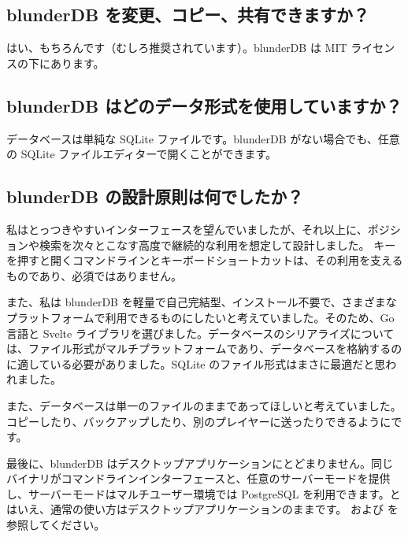 \documentclass[letterpaper,10pt,dvipdfmx]{sphinxmanual}
\begin{document}
\subsection{blunderDB を変更、コピー、共有できますか？}
\label{\detokenize{faq:puis-je-modifier-copier-partager-blunderdb}}
\sphinxAtStartPar
はい、もちろんです（むしろ推奨されています）。blunderDB は MIT ライセンスの下にあります。


\subsection{blunderDB はどのデータ形式を使用していますか？}
\label{\detokenize{faq:quel-format-de-donnees-utilise-blunderdb}}
\sphinxAtStartPar
データベースは単純な SQLite ファイルです。blunderDB がない場合でも、任意の SQLite ファイルエディターで開くことができます。


\subsection{blunderDB の設計原則は何でしたか？}
\label{\detokenize{faq:quelles-ont-ete-les-principes-de-conception-de-blunderdb}}
\sphinxAtStartPar
私はとっつきやすいインターフェースを望んでいましたが、それ以上に、ポジションや検索を次々とこなす高度で継続的な利用を想定して設計しました。 キーを押すと開くコマンドラインとキーボードショートカットは、その利用を支えるものであり、必須ではありません。

\sphinxAtStartPar
また、私は blunderDB を軽量で自己完結型、インストール不要で、さまざまなプラットフォームで利用できるものにしたいと考えていました。そのため、Go 言語と Svelte ライブラリを選びました。データベースのシリアライズについては、ファイル形式がマルチプラットフォームであり、データベースを格納するのに適している必要がありました。SQLite のファイル形式はまさに最適だと思われました。

\sphinxAtStartPar
また、データベースは単一のファイルのままであってほしいと考えていました。コピーしたり、バックアップしたり、別のプレイヤーに送ったりできるようにです。

\sphinxAtStartPar
最後に、blunderDB はデスクトップアプリケーションにとどまりません。同じバイナリがコマンドラインインターフェースと、任意のサーバーモードを提供し、サーバーモードはマルチユーザー環境では PostgreSQL を利用できます。とはいえ、通常の使い方はデスクトップアプリケーションのままです。{\hyperref[\detokenize{cli:cli}]{}} および {\hyperref[\detokenize{mode_headless:headless}]{}} を参照してください。
\end{document}
